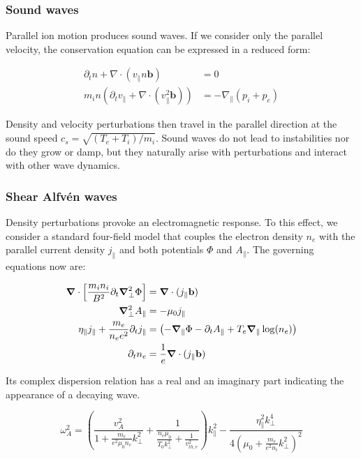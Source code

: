 \subsubsection{Sound waves}

Parallel ion motion produces sound waves. If we consider only the parallel velocity, the conservation equation can be expressed in a reduced form:

\begin{align}
	\partial_t n + \nabla \cdot (v_\parallel n\mathbf{b}) &= 0 \\
	m_i n \left(\partial_t v_\parallel + \nabla \cdot \left(v_\parallel^2 \mathbf{b}\right)\right) &= -\nabla_\parallel (p_i + p_e)
\end{align}

Density and velocity perturbations then travel in the parallel direction at the sound speed $ c_s = \sqrt{(T_e + T_i)/m_i} $. Sound waves do not lead to instabilities nor do they grow or damp, but they naturally arise with perturbations and interact with other wave dynamics.


\subsubsection{Shear Alfvén waves}
\label{ssec:edge_shearAlfvenWaves}

Density perturbations provoke an electromagnetic response. To this effect, we consider a standard four-field model that couples the electron density $n_e$ with the parallel current density $j_\parallel$ and both potentials $\Phi$ and $A_\parallel$. The governing equations now are: 

\begin{align}
	\grad\cdot\left[\frac{m_i n_i}{ B^2}\partial_t\grad^2_\perp\Phi\right] &= \grad\cdot(j_\parallel\mathbf{b}) \\
	\grad^2_\perp A_\parallel &= -\mu_0j_\parallel \\
	\eta_\parallel j_\parallel + \frac{ m_e}{n_ee^2} \partial_t j_\parallel  &= \left(-\grad_\parallel\Phi - \partial_t A_\parallel + T_e\grad_\parallel\log(n_e)\right) \\
	\partial_t n_e &= \frac{1}{e}\grad\cdot (j_\parallel\mathbf{b}) 
	\label{eq:fourFieldModel}
\end{align}

Its complex dispersion relation has a real and an imaginary part indicating the appearance of a decaying wave. 

\begin{equation}
	\label{eq:dispersionRelation}
    \omega_A^2 = \left(\frac{v_A^2}{1 + \frac{m_e}{e^2 \mu_0 n_e} k_\perp^2} + \frac{1}{\frac{n_e \mu_0}{T_0 k_\perp^2} + \frac{1}{v_{th,e}^2}}\right) k_\parallel^2 - \frac{\eta_\parallel^2k_\perp^4}{4\left(\mu_0+\frac{m_e}{e^2n_i}k_\perp^2\right)^2}
\end{equation}

